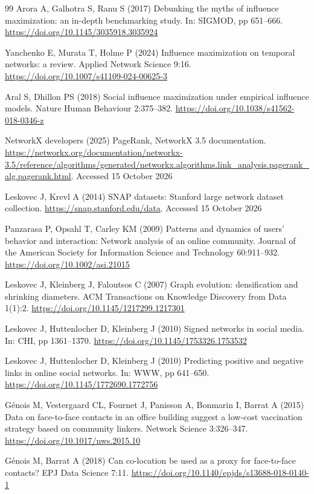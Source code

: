 \documentclass[smallextended]{svjour3}
\begin{document}
\begin{thebibliography}{99}
 Arora A, Galhotra S, Ranu S (2017) Debunking the myths of influence maximization: an in-depth benchmarking study. In: SIGMOD, pp 651--666. \url{https://doi.org/10.1145/3035918.3035924}

 Yanchenko E, Murata T, Holme P (2024) Influence maximization on temporal networks: a review. Applied Network Science 9:16. \url{https://doi.org/10.1007/s41109-024-00625-3}

 Aral S, Dhillon PS (2018) Social influence maximization under empirical influence models. Nature Human Behaviour 2:375--382. \url{https://doi.org/10.1038/s41562-018-0346-z}

 NetworkX developers (2025) PageRank, NetworkX 3.5 documentation. \url{https://networkx.org/documentation/networkx-3.5/reference/algorithms/generated/networkx.algorithms.link_analysis.pagerank_alg.pagerank.html}. Accessed 15 October 2026

 Leskovec J, Krevl A (2014) SNAP datasets: Stanford large network dataset collection. \url{https://snap.stanford.edu/data}. Accessed 15 October 2026

 Panzarasa P, Opsahl T, Carley KM (2009) Patterns and dynamics of users' behavior and interaction: Network analysis of an online community. Journal of the American Society for Information Science and Technology 60:911--932. \url{https://doi.org/10.1002/asi.21015}

 Leskovec J, Kleinberg J, Faloutsos C (2007) Graph evolution: densification and shrinking diameters. ACM Transactions on Knowledge Discovery from Data 1(1):2. \url{https://doi.org/10.1145/1217299.1217301}

 Leskovec J, Huttenlocher D, Kleinberg J (2010) Signed networks in social media. In: CHI, pp 1361--1370. \url{https://doi.org/10.1145/1753326.1753532}

 Leskovec J, Huttenlocher D, Kleinberg J (2010) Predicting positive and negative links in online social networks. In: WWW, pp 641--650. \url{https://doi.org/10.1145/1772690.1772756}

 Génois M, Vestergaard CL, Fournet J, Panisson A, Bonmarin I, Barrat A (2015) Data on face-to-face contacts in an office building suggest a low-cost vaccination strategy based on community linkers. Network Science 3:326--347. \url{https://doi.org/10.1017/nws.2015.10}

 Génois M, Barrat A (2018) Can co-location be used as a proxy for face-to-face contacts? EPJ Data Science 7:11. \url{https://doi.org/10.1140/epjds/s13688-018-0140-1}


\end{thebibliography}
\end{document}
